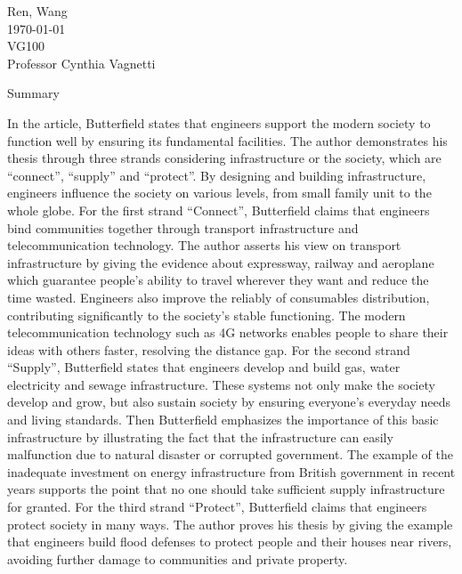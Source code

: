 \documentclass[12pt,a4]{article}
\begin{document}
\begin{flushleft}
Ren, Wang\\
\today\\
VG100\\
Professor Cynthia Vagnetti \\
\end{flushleft}

\begin{center}
Summary
\end{center}


In the article, Butterfield \cite{but} states that engineers support the modern
society to function well by ensuring its fundamental facilities. 
The author demonstrates his thesis through three strands considering
infrastructure or the society, which are ``connect'', ``supply'' and
``protect''. 
By designing and building infrastructure, engineers influence the society on
various levels, from small family unit to the whole globe.  
%
%
For the first strand ``Connect'', Butterfield claims that engineers bind
communities together through transport infrastructure and telecommunication
technology.
The author asserts his view on transport infrastructure by giving the evidence
about expressway, railway and aeroplane which guarantee people's ability to
travel wherever they want and reduce the time wasted. 
Engineers also improve the reliably of consumables distribution, contributing
significantly to the society's stable functioning. 
The modern telecommunication technology such as 4G networks enables people to
share their ideas with others faster, resolving the distance gap.
%
%
For the second strand ``Supply'', Butterfield states that engineers develop and
build gas, water electricity and sewage infrastructure.
These systems not only make the society develop and grow, but also sustain
society by ensuring everyone's everyday needs and living standards.
Then Butterfield emphasizes the importance of this basic infrastructure by
illustrating the fact that the infrastructure can easily malfunction due to
natural disaster or corrupted government.
The example of the inadequate investment on energy infrastructure from British
government in recent years supports the point that no one should take sufficient
supply infrastructure for granted.
%
%
For the third strand ``Protect'', Butterfield claims that engineers protect
society in many ways.
The author proves his thesis by giving the example that engineers build flood
defenses to protect people and their houses near rivers, avoiding further damage
to communities and private property.
\end{document}
